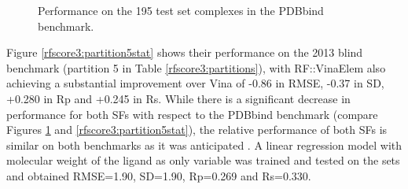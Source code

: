 \begin{figure}
\centering
{}
\caption{Performance on the 195 test set complexes in the PDBbind benchmark.}
\label{rfscore3:partition1stat}
\end{figure}

Figure \ref{rfscore3:partition5stat} shows their performance on the 2013 blind benchmark (partition 5 in Table \ref{rfscore3:partitions}), with RF::VinaElem also achieving a substantial improvement over Vina of -0.86 in RMSE, -0.37 in SD, +0.280 in Rp and +0.245 in Rs. While there is a significant decrease in performance for both SFs with respect to the PDBbind benchmark (compare Figures \ref{rfscore3:partition1stat} and \ref{rfscore3:partition5stat}), the relative performance of both SFs is similar on both benchmarks as it was anticipated \citep{908}. A linear regression model with molecular weight of the ligand as only variable was trained and tested on the sets and obtained RMSE=1.90, SD=1.90, Rp=0.269 and Rs=0.330.

